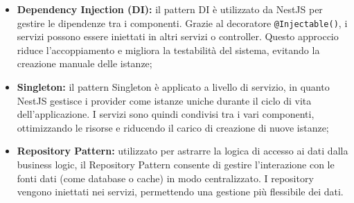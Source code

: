 \begin{itemize}
  \item \textbf{Dependency Injection (DI):} il pattern DI è utilizzato da NestJS per gestire le dipendenze tra i componenti. Grazie al decoratore \texttt{@Injectable()}, i servizi possono essere iniettati in altri servizi o controller. Questo approccio riduce l'accoppiamento e migliora la testabilità del sistema, evitando la creazione manuale delle istanze;
  
  \item \textbf{Singleton:} il pattern Singleton è applicato a livello di servizio, in quanto NestJS gestisce i provider come istanze uniche durante il ciclo di vita dell'applicazione. I servizi sono quindi condivisi tra i vari componenti, ottimizzando le risorse e riducendo il carico di creazione di nuove istanze;

  \item \textbf{Repository Pattern:} utilizzato per astrarre la logica di accesso ai dati dalla business logic, il Repository Pattern consente di gestire l'interazione con le fonti dati (come database o cache) in modo centralizzato. I repository vengono iniettati nei servizi, permettendo una gestione più flessibile dei dati.
\end{itemize}

